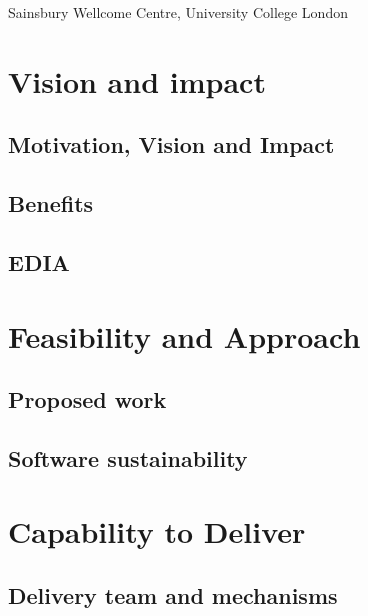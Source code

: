 \documentclass[12pt]{article}
\begin{document}
Sainsbury Wellcome Centre, University College London

\pagebreak

\section{Vision and impact}

\subsection{Motivation, Vision and Impact}



\subsection{Benefits}



\subsection{EDIA}



\pagebreak

\section{Feasibility and Approach}

\subsection{Proposed work}



\subsection{Software sustainability}



\pagebreak

\section{Capability to Deliver}

\subsection{Delivery team and mechanisms}





\end{document}
